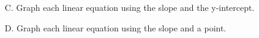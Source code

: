 
\begin{enumerate}[label = \Alph*. ]
\item[C. ] \hspce Graph each linear equation using the slope  and the  y-intercept. 
\begin{enumerate}[label = \arabic*. ]
\end{enumerate}  

\vspce 
\item[D. ] \hspce Graph each linear equation using the slope  and a point.  
\begin{enumerate}[label = \arabic*. ]
\end{enumerate}  

\end{enumerate}  